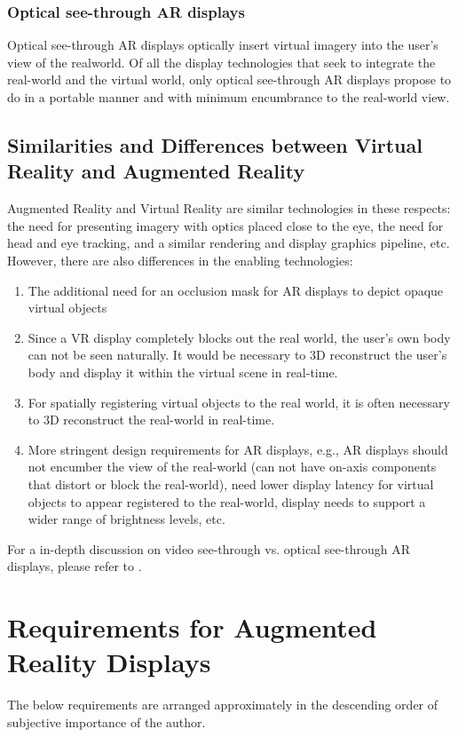 \subsubsection{Optical see-through AR displays}
\label{sec:background:ost_displays}
Optical see-through AR displays optically insert virtual imagery into the user’s view of the realworld. 
Of all the display technologies that seek to integrate the real-world and the virtual world, only optical see-through AR displays propose to do in a portable manner and with minimum encumbrance to the real-world view.

\subsection{Similarities and Differences between Virtual Reality and Augmented Reality}
\label{sec:background:ar_vs_vr_displays}

Augmented Reality and Virtual Reality are similar technologies in these respects: the need for presenting imagery with optics placed close to the eye, the need for head and eye tracking, and a similar rendering and display graphics pipeline, etc. 
However, there are also differences in the enabling technologies:

\begin{enumerate}
    \item The additional need for an occlusion mask for AR displays to depict opaque virtual objects
    \item Since a VR display completely blocks out the real world, the user’s own body can not be seen naturally. It would be necessary to 3D reconstruct the user’s body and display it within the virtual scene in real-time.
    \item For spatially registering virtual objects to the real world, it is often necessary to 3D reconstruct the real-world in real-time.
    \item More stringent design requirements for AR displays, e.g., AR displays should not encumber the view of the real-world (can not have on-axis components that distort or block the real-world), need lower display latency for virtual objects to appear registered to the real-world, display needs to support a wider range of brightness levels, etc. 
\end{enumerate}
For a in-depth discussion on video see-through vs. optical see-through AR displays, please refer to \cite{Rolland2000,rolland1995comparison}. 

\section{Requirements for Augmented Reality Displays}
\label{sec:background:requirements_ar_displays}
The below requirements are arranged approximately in the descending order of subjective importance of the author.

